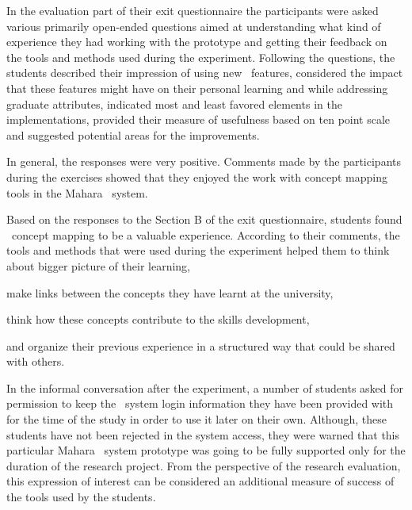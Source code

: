 In the evaluation part of their exit questionnaire the participants were asked
various primarily open-ended questions aimed at understanding what kind of
experience they had working with the prototype and getting their feedback on the
tools and methods used during the experiment. Following the questions, the
students described their impression of using new \ep~features, considered the
impact that these features might have on their personal learning and while
addressing graduate attributes, indicated most and least favored elements in the
implementations, provided their measure of usefulness based on ten point scale
and suggested potential areas for the improvements.

In general, the responses were very positive. Comments made by the participants
during the exercises showed that they enjoyed the work with concept mapping
tools in the Mahara \ep~system. 

Based on the responses to the Section B of the exit questionnaire, students
found \ep~concept mapping to be a valuable experience. According to their
comments, the tools and methods that were used during the experiment helped
them to think about bigger picture of their learning, 


make links between the concepts they have learnt at the university, 

think how these concepts contribute to the skills development, 

and organize their previous experience in a structured way that could be shared
with others.

In the informal conversation after the experiment, a number of students asked
for permission to keep the \ep~system login information they have been provided
with for the time of the study in order to use it later on their own. Although,
these students have not been rejected in the system access, they were warned
that this particular Mahara \ep~system prototype was going to be fully supported
only for the duration of the research project. From the perspective of the
research evaluation, this expression of interest can be considered an additional
measure of success of the tools used by the students.

